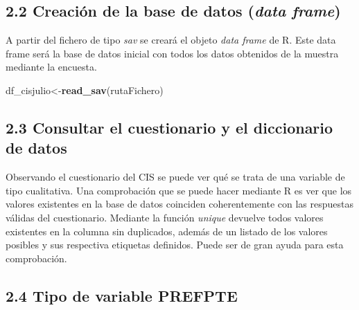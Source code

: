 \documentclass[
  12 pt,
  a4paper,
]{article}
\newenvironment{Shaded}{\begin{snugshade}}{\end{snugshade}}
\newcommand{\CommentTok}[1]{\textcolor[rgb]{0.56,0.35,0.01}{\textit{#1}}}
\newcommand{\FunctionTok}[1]{\textcolor[rgb]{0.13,0.29,0.53}{\textbf{#1}}}
\newcommand{\NormalTok}[1]{#1}
\newcommand{\OtherTok}[1]{\textcolor[rgb]{0.56,0.35,0.01}{#1}}
\newcommand{\SpecialCharTok}[1]{\textcolor[rgb]{0.81,0.36,0.00}{\textbf{#1}}}
\begin{document}
\hypertarget{creaciuxf3n-de-la-base-de-datos-data-frame}{%
\subsection{\texorpdfstring{2.2 Creación de la base de datos (\emph{data
frame})}{2.2 Creación de la base de datos (data frame)}}\label{creaciuxf3n-de-la-base-de-datos-data-frame}}

A partir del fichero de tipo \emph{sav} se creará el objeto \emph{data
frame} de R. Este data frame será la base de datos inicial con todos los
datos obtenidos de la muestra mediante la encuesta.

\begin{Shaded}
\begin{Highlighting}[]
\NormalTok{df\_cisjulio}\OtherTok{\textless{}{-}}\FunctionTok{read\_sav}\NormalTok{(rutaFichero)}
\end{Highlighting}
\end{Shaded}

\hypertarget{consultar-el-cuestionario-y-el-diccionario-de-datos}{%
\subsection{2.3 Consultar el cuestionario y el diccionario de
datos}\label{consultar-el-cuestionario-y-el-diccionario-de-datos}}

Observando el cuestionario del CIS se puede ver qué se trata de una
variable de tipo cualitativa. Una comprobación que se puede hacer
mediante R es ver que los valores existentes en la base de datos
coinciden coherentemente con las respuestas válidas del cuestionario.
Mediante la función \emph{unique} devuelve todos valores existentes en
la columna sin duplicados, además de un listado de los valores posibles
y sus respectiva etiquetas definidos. Puede ser de gran ayuda para esta
comprobación.

\begin{Shaded}
\end{Shaded}

\hypertarget{tipo-de-variable-prefpte}{%
\subsection{2.4 Tipo de variable
PREFPTE}\label{tipo-de-variable-prefpte}}
\end{document}
